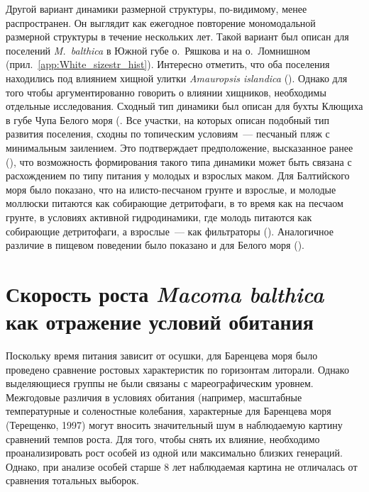 Другой вариант динамики размерной структуры, по-видимому, менее распространен.
Он выглядит как ежегодное повторение мономодальной размерной структуры в течение нескольких лет.
Такой вариант был описан для поселений \textit{M.~balthica} в Южной губе о.~Ряшкова и на о.~Ломнишном (прил.~\ref{app:White_sizestr_hist}).
Интересно отметить, что оба поселения находились под влиянием хищной улитки \textit{Amauropsis islandica} (\cite{Aristov_Granovich_2011}).
Однако для того чтобы аргументированно говорить о влиянии хищников, необходимы отдельные исследования.
Сходный тип динамики был описан для бухты Клющиха в губе Чупа Белого моря (\cite{Maximovich_et_al_1991, Gerasimova_Maximovich_2013}.
Все участки, на которых описан подобный тип развития поселения, сходны по топическим условиям~--- песчаный пляж с минимальным заилением.
Это подтверждает предположение, высказанное ранее (\cite{Gerasimova_Maximovich_2013}), что возможность формирования такого типа динамики может быть связана с расхождением по типу питания у молодых и взрослых маком.
Для Балтийского моря было показано, что на илисто-песчаном грунте и взрослые, и молодые моллюски питаются как собирающие детритофаги, в то время как на песчаом грунте, в условиях активной гидродинамики, где молодь питаются как собирающие детритофаги, а взрослые~--- как фильтраторы (\cite{Olafsson_1989}). 
Аналогичное различие в пищевом поведении было показано и для Белого моря (\cite{Gerasimova_1988}).

\afterpage{\clearpage}

		\section{Скорость роста {\it Macoma balthica} как отражение условий обитания}

Поскольку время питания зависит от осушки, для Баренцева моря было проведено сравнение ростовых характеристик по горизонтам литорали. Однако выделяющиеся группы не были связаны с мареографическим уровнем.
Межгодовые различия в условиях обитания (например, масштабные температурные и соленостные колебания, характерные для Баренцева моря (Терещенко, 1997) могут вносить значительный шум в наблюдаемую картину сравнений темпов роста. 
Для того, чтобы снять их влияние, необходимо проанализировать рост особей из одной или максимально близких генераций. 
Однако, при анализе особей старше 8 лет наблюдаемая картина не отличалась от сравнения тотальных выборок.

